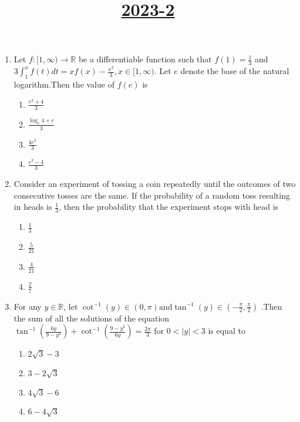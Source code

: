 \documentclass[12pt,a4paper]{article}
\begin{document}
\title{\underline{\textbf{2023-2}}}      \date{}\maketitle                    

\begin{enumerate}
\item Let $f :[1, \infty) \to \mathbb{R}$ be a differentiable function such that $f(1) = \frac{1}{3}$ and $3 \int_{1}^{x}  f(t) dt = x f(x) - \frac{x^2}{3},x \in [1, \infty).$ Let $e$ denote the base of the natural logarithm.Then the value of $f(e)$ is\\
\begin{enumerate}[label=\Alph*.]
\item $\frac{e^2+4}{3}$
\item $\frac{\log_{e}{4} + e}{3}$
\item $\frac{4e^2}{3}$
\item $\frac{e^2-4}{3}$
\end{enumerate}

\item Consider an experiment of tossing a coin repeatedly until the outcomes of two consecutive tosses are the same. If the probability of a random toss resulting in heads is $\frac{1}{3}$, then the probability that the experiment stops with head is\\
\begin{enumerate}
\item $\frac{1}{3}$                             \item $\frac{5}{21}$                            \item $\frac{4}{21}$
\item $\frac{2}{7}$
\end{enumerate}

\item For any $y \in \mathbb{R}$, let $\cot^{-1}(y) \in (0, \pi) \text{and} \tan^{-1}(y) \in \left( -\frac{\pi}{2}, \frac{\pi}{2} \right)$ .Then the sum of all the solutions of the equation $\tan^{-1}(\frac{6y}{9-y^2}) + \cot^{-1}(\frac{9-y^2}{6y}) =\frac{2\pi}{3}$ for $0 < |y| < 3$ is equal to\\
\begin{enumerate}
\item $2\sqrt{3}-3$
\item $3 - 2\sqrt{3}$
\item $4\sqrt{3} - 6$
\item $6-4\sqrt{3}$
\end{enumerate}



\end{enumerate}
\end{document}

